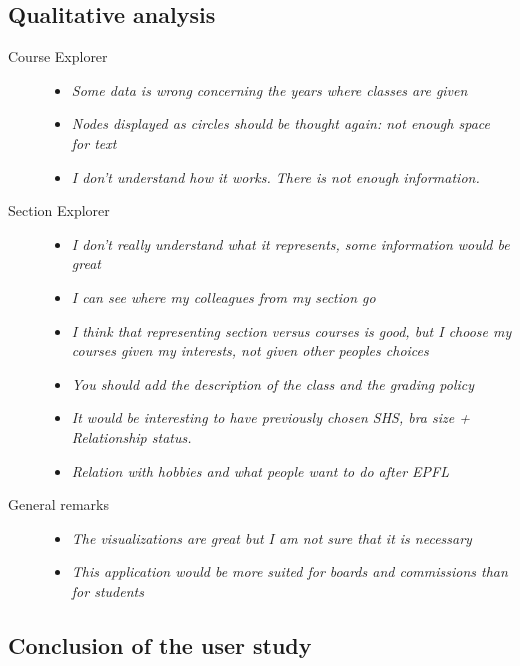 \subsection{Qualitative analysis}

\begin{description}
\item[Course Explorer] \quad 
	\begin{itemize}
	\item \emph{Some data is wrong concerning the years where classes are given}
	\item \emph{Nodes displayed as circles should be thought again: not enough space for text}
	\item \emph{I don't understand how it works. There is not enough information.}
	\end{itemize}
\item[Section Explorer] \quad 
	\begin{itemize}
	\item \emph{I don't really understand what it represents, some information would be great}
	\item \emph{I can see where my colleagues from my section go}
	\item \emph{I think that representing section versus courses is good, but I choose my courses given my interests, not given other peoples choices}
	\item \emph{You should add the description of the class and the grading policy}
	\item \emph{It would be interesting to have previously chosen SHS, bra size + Relationship status.}
	\item \emph{Relation with hobbies and what people want to do after EPFL}
	\end{itemize}
\item[General remarks] \quad
	\begin{itemize}
	\item \emph{The visualizations are great but I am not sure that it is necessary}
	\item \emph{This application would be more suited for boards and commissions than for students}
	\end{itemize}
\end{description}

\subsection{Conclusion of the user study}

